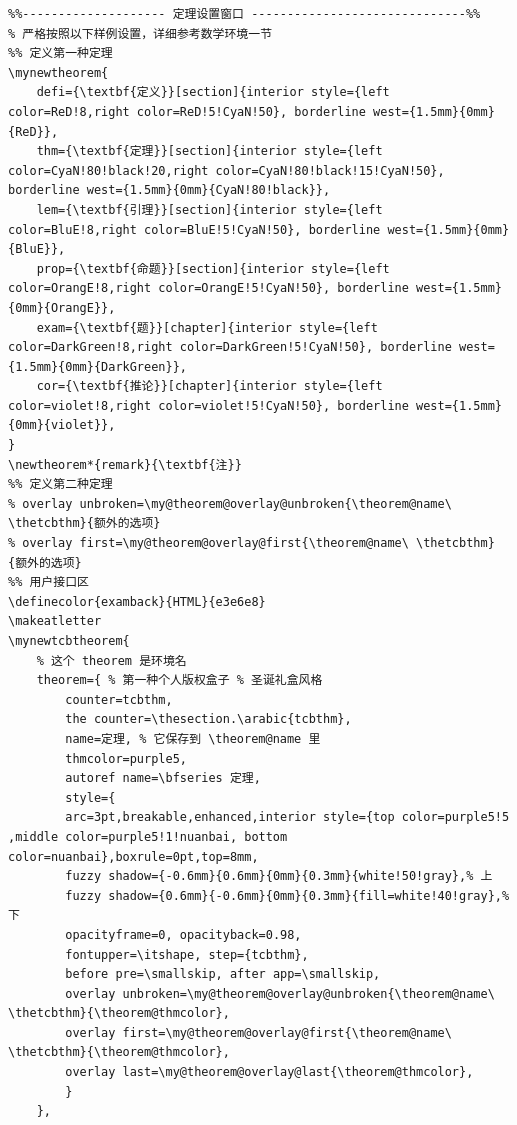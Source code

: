 \documentclass{Beautybook-V6.1}
\begin{document}
\begin{lstlisting}
%%-------------------- 定理设置窗口 ------------------------------%%
% 严格按照以下样例设置，详细参考数学环境一节
%% 定义第一种定理
\mynewtheorem{
    defi={\textbf{定义}}[section]{interior style={left color=ReD!8,right color=ReD!5!CyaN!50}, borderline west={1.5mm}{0mm}{ReD}},
    thm={\textbf{定理}}[section]{interior style={left color=CyaN!80!black!20,right color=CyaN!80!black!15!CyaN!50}, borderline west={1.5mm}{0mm}{CyaN!80!black}},
    lem={\textbf{引理}}[section]{interior style={left color=BluE!8,right color=BluE!5!CyaN!50}, borderline west={1.5mm}{0mm}{BluE}},
    prop={\textbf{命题}}[section]{interior style={left color=OrangE!8,right color=OrangE!5!CyaN!50}, borderline west={1.5mm}{0mm}{OrangE}},
    exam={\textbf{题}}[chapter]{interior style={left color=DarkGreen!8,right color=DarkGreen!5!CyaN!50}, borderline west={1.5mm}{0mm}{DarkGreen}},
    cor={\textbf{推论}}[chapter]{interior style={left color=violet!8,right color=violet!5!CyaN!50}, borderline west={1.5mm}{0mm}{violet}},
}
\newtheorem*{remark}{\textbf{注}}
%% 定义第二种定理
% overlay unbroken=\my@theorem@overlay@unbroken{\theorem@name\ \thetcbthm}{额外的选项}
% overlay first=\my@theorem@overlay@first{\theorem@name\ \thetcbthm}{额外的选项}
%% 用户接口区
\definecolor{examback}{HTML}{e3e6e8}
\makeatletter
\mynewtcbtheorem{
    % 这个 theorem 是环境名
    theorem={ % 第一种个人版权盒子 % 圣诞礼盒风格
        counter=tcbthm, 
        the counter=\thesection.\arabic{tcbthm}, 
        name=定理, % 它保存到 \theorem@name 里
        thmcolor=purple5,
        autoref name=\bfseries 定理, 
        style={
        arc=3pt,breakable,enhanced,interior style={top color=purple5!5 ,middle color=purple5!1!nuanbai, bottom color=nuanbai},boxrule=0pt,top=8mm,
        fuzzy shadow={-0.6mm}{0.6mm}{0mm}{0.3mm}{white!50!gray},% 上
        fuzzy shadow={0.6mm}{-0.6mm}{0mm}{0.3mm}{fill=white!40!gray},%下
        opacityframe=0, opacityback=0.98,
        fontupper=\itshape, step={tcbthm},
        before pre=\smallskip, after app=\smallskip,
        overlay unbroken=\my@theorem@overlay@unbroken{\theorem@name\ \thetcbthm}{\theorem@thmcolor},
        overlay first=\my@theorem@overlay@first{\theorem@name\ \thetcbthm}{\theorem@thmcolor},
        overlay last=\my@theorem@overlay@last{\theorem@thmcolor},
        }
    },


\end{lstlisting}
\end{document}
